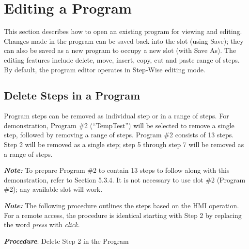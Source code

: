 \section{Editing a Program}

This section describes how to open an existing program for viewing and
editing. Changes made in the program can be saved back into the slot
(using Save); they can also be saved as a new program to occupy a new
slot (with Save As). The editing features include delete, move, insert,
copy, cut and paste range of steps. By default, the program editor
operates in Step-Wise editing mode.


\subsection{Delete Steps in a
Program}

Program steps can be removed as individual step or in a range of steps.
For demonstration, Program \#2 (``TempTest'') will be selected to remove
a single step, followed by removing a range of steps. Program \#2
consists of 13 steps. Step 2 will be removed as a single step; step 5
through step 7 will be removed as a range of steps.

\textbf{\emph{Note:}} To prepare Program \#2 to contain 13 steps to
follow along with this demonstration, refer to Section 5.3.4. It is not
necessary to use slot \#2 (Program \#2); any available slot will work.

\textbf{\emph{Note:}} The following procedure outlines the steps based
on the HMI operation. For a remote access, the procedure is identical
starting with Step 2 by replacing the word \emph{press} with
\emph{click}.

\textbf{\emph{Procedure}}: Delete Step 2 in the Program

